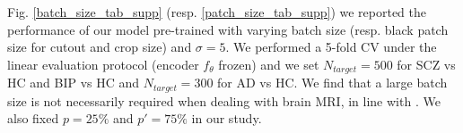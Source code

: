 \documentclass[runningheads]{llncs}
\begin{document}

Fig. \ref{batch_size_tab_supp} (resp. \ref{patch_size_tab_supp}) we reported the performance of our model pre-trained with varying batch size (resp. black patch size for cutout and crop size) and $\sigma=5$. We performed a 5-fold CV under the linear evaluation protocol (encoder $f_\theta$ frozen) and we set $N_{target}=500$ for SCZ vs HC and BIP vs HC and $N_{target}=300$ for AD vs HC. We find that a large batch size is not necessarily required when dealing with brain MRI, in line with \cite{chaitanya2020contrastive}. We also fixed $p=25\%$ and $p'=75\%$ in our study.
\end{document}
